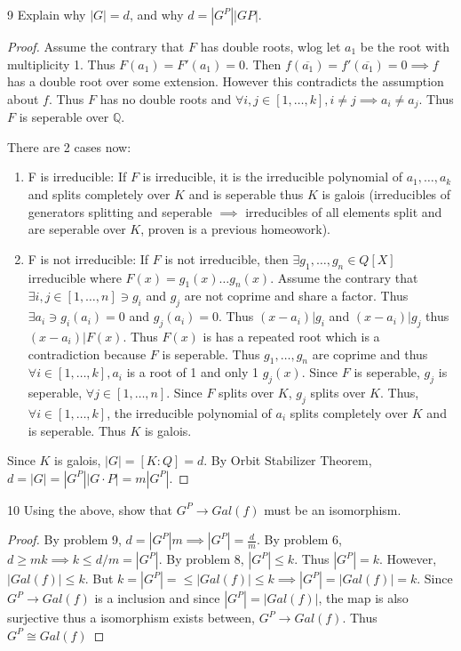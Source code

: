 \documentclass{article}
\newcommand{\Q}{\mathbb{Q}}
\begin{document}
\begin{PROB}{9}\label{Problem 9.}
    Explain why $|G| = d$, and why $d = |G^P| |G P|$. 
\end{PROB}
\begin{proof}
    Assume the contrary that $F$ has double roots, wlog let $a_1$ be the root with multiplicity 1. Thus $F(a_1) = F'(a_1) = 0$. Then $f(\overline{a_1}) = f'(\overline{a_1}) = 0 \implies f$ has a double root over some extension. However this contradicts the assumption about $f$. Thus $F$ has no double roots and $\forall i, j \in [1, \dots, k], i \neq j \implies a_i \neq a_j$. Thus $F$ is seperable over $\Q$.
    
    There are 2 cases now: 
    
    \begin{enumerate}
        \item F is irreducible: If $F$ is irreducible, it is the irreducible polynomial of $a_1, \dots, a_k$ and splits completely over $K$ and is seperable thus $K$ is galois (irreducibles of generators splitting and seperable $\implies$ irreducibles of all elements split and are seperable over $K$, proven is a previous homeowork). 
        \item F is not irreducible: If $F$ is not irreducible, then $\exists g_1, \dots, g_n \in Q[X]$ irreducible where $F(x) = g_1(x) \dots g_n(x)$. Assume the contrary that $\exists i, j \in [1, \dots, n] \ni g_i$ and $g_j$ are not coprime and share a factor. Thus $\exists a_i \ni g_i(a_i)  = 0$ and $g_j(a_i) = 0$. Thus $(x - a_i) | g_i$ and $(x - a_i) | g_j$ thus $(x - a_i) | F(x)$. Thus $F(x)$ is has a repeated root which is a contradiction because $F$ is seperable. Thus $g_1, \dots, g_n$ are coprime and thus $\forall i \in  [1, \dots, k], a_i$ is a root of 1 and only 1 $g_j(x)$. Since $F$ is seperable, $g_j$ is seperable, $\forall j \in [1, \dots, n]$. Since $F$ splits over $K$, $g_j$ splits over $K$. Thus, $\forall i \in [1, \dots, k]$, the irreducible polynomial of $a_i$ splits completely over $K$ and is seperable. Thus $K$ is galois.            
    \end{enumerate}
    
    Since $K$ is galois, $|G| = [K : Q] = d$. By Orbit Stabilizer Theorem, $d = |G| = |G^P| |G \cdot P| = m|G^P|$.   
\end{proof}
\bigskip

\begin{PROB}{10}\label{Problem 10.}
    Using the above, show that $G^P \to Gal(f)$ must be an isomorphism. 
\end{PROB}
\begin{proof}
    By problem 9, $d = |G^P|m  \implies |G^P| = \frac{d}{m}$. By problem 6, $d \geq m k \implies k \leq d / m = |G^P|$. By problem 8, $|G^P| \leq k$. Thus $|G^P| = k$. However, $|Gal(f)| \leq k$. But $k = |G^P| = \leq |Gal(f)| \leq k \implies |G^P| = |Gal(f)| = k$. Since $G^P \to Gal(f)$ is a inclusion and since $|G^P| = |Gal(f)|$, the map is also surjective thus a isomorphism exists between, $G^P \to Gal(f)$. Thus $G^P \cong Gal(f)$ 
\end{proof}
\end{document}
